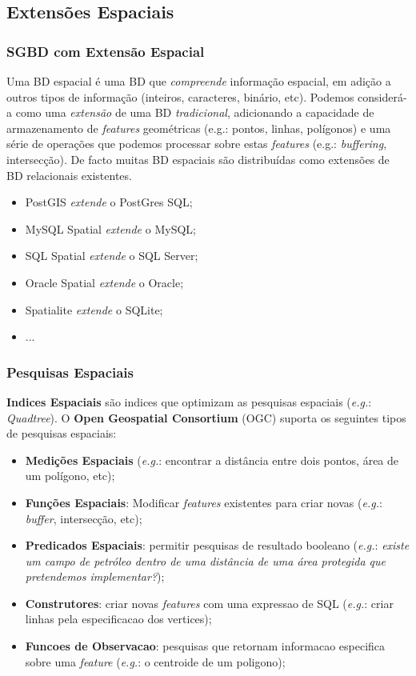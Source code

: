 \documentclass[hyperref={pdfpagelabels=true}]{beamer}
\begin{document}
\subsection{Extens\~{o}es Espaciais}
\begin{frame}
\frametitle{SGBD com Extens\~{a}o Espacial}
Uma BD espacial \'{e} uma BD que \textit{compreende} informa\c{c}\~{a}o espacial, em adi\c{c}\~{a}o a outros tipos de informa\c{c}\~{a}o (inteiros, caracteres, bin\'{a}rio, etc).
Podemos consider\'{a}-a como uma \textit{extens\~{a}o} de uma BD \textit{tradicional}, adicionando a capacidade de armazenamento de
\textit{features} geom\'{e}tricas (e.g.: pontos, linhas, pol\'{i}gonos) e uma s\'{e}rie de opera\c{c}\~{o}es que podemos processar sobre estas \textit{features} 
(e.g.: \textit{buffering}, intersec\c{c}\~{a}o). De facto muitas BD espaciais s\~{a}o distribu\'{i}das como extens\~{o}es de BD relacionais existentes.
    \begin{itemize}
      \item<2-> PostGIS \textit{extende} o PostGres SQL;
      \item<2-> MySQL Spatial \textit{extende} o MySQL;
      \item<2-> SQL Spatial \textit{extende} o SQL Server;
      \item<2-> Oracle Spatial \textit{extende} o Oracle;
      \item<2-> Spatialite \textit{extende} o SQLite;
      \item<2-> ... 
      \end{itemize}  
\end{frame}

\begin{frame}
\frametitle{Pesquisas Espaciais}
\textbf{Indices Espaciais} s\~{a}o indices que optimizam as pesquisas espaciais (\textit{e.g.}: \textit{Quadtree}).
O \textbf{Open Geospatial Consortium} (OGC) suporta os seguintes tipos de pesquisas espaciais:
    \begin{itemize}
      \item<2-> \textbf{Medi\c{c}\~{o}es Espaciais} (\textit{e.g.}: encontrar a dist\^{a}ncia entre dois pontos, \'{a}rea de um pol\'{i}gono, etc);
      \item<3-> \textbf{Fun\c{c}\~{o}es Espaciais}: Modificar \textit{features} existentes para criar novas (\textit{e.g.}: \textit{buffer}, intersec\c{c}\~{a}o, etc);
      \item<4-> \textbf{Predicados Espaciais}: permitir pesquisas de resultado booleano (\textit{e.g.}: \textit{existe um campo de petr\'{o}leo dentro de uma dist\^{a}ncia de uma \'{a}rea protegida que pretendemos implementar?});
      \item<5-> \textbf{Construtores}: criar novas \textit{features} com uma expressao de SQL (\textit{e.g.}: criar linhas pela especificacao dos vertices);
      \item<6-> \textbf{Funcoes de Observacao}: pesquisas que retornam informacao especifica sobre uma \textit{feature} (\textit{e.g.}: o centroide de um poligono);
    \end{itemize}  
\end{frame}
\end{document}
